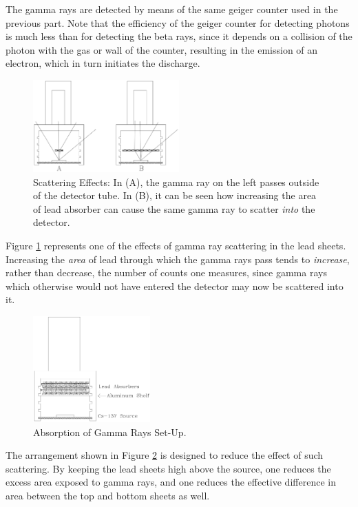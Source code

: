 The gamma rays are detected by means of the same geiger counter used in the previous part. Note that the efficiency of the geiger counter for detecting photons is much less than for detecting the beta rays, since it depends on a collision of the photon with the gas or wall of the counter, resulting in the emission of an electron, which in turn initiates the discharge.\myskip
\begin{figure}[h]
\centering
\includegraphics[width=0.5\textwidth]{./Exp10/pic/image10.png}
\caption{Scattering Effects: In (A), the gamma ray on the left passes outside of the detector tube. In (B), it can be seen how increasing the area of lead absorber can cause the same gamma ray to scatter \emph{into} the detector.}
\label{fig:scattering}
\end{figure} 

Figure {\ref{fig:scattering}} represents one of the effects of gamma ray scattering in the lead sheets. Increasing the \emph{area} of lead through which the gamma rays pass tends to \emph{increase}, rather than decrease, the number of counts one measures, since gamma rays which otherwise would not have entered the detector may now be scattered into it.\myskip
\begin{figure}[h]
\centering
\includegraphics[width=0.4\textwidth]{./Exp10/pic/image11.png}
\caption{Absorption of Gamma Rays Set-Up.}
\label{fig:gammarays}
\end{figure} 

The arrangement shown in Figure {\ref{fig:gammarays}} is designed to reduce the effect of such scattering. By keeping the lead sheets high above the source, one reduces the excess area exposed to gamma rays, and one reduces the effective difference in area between the top and bottom sheets as well.\myskip

